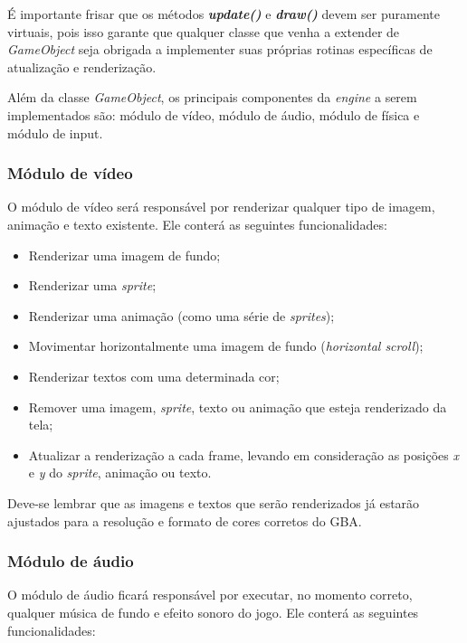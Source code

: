     É importante frisar que os métodos \textbf{\textit{update()}} e \textbf{\textit{draw()}} devem ser puramente virtuais, pois isso garante que qualquer classe que venha a extender de \textit{GameObject} seja obrigada a implementer suas próprias rotinas específicas de atualização e renderização.

    Além da classe \textit{GameObject}, os principais componentes da \textit{engine} a serem implementados são: módulo de vídeo, módulo de áudio, módulo de física e módulo de input.

    \subsubsection{Módulo de vídeo}

      O módulo de vídeo será responsável por renderizar qualquer tipo de imagem, animação e texto existente. Ele conterá as seguintes funcionalidades:

      \begin{itemize}
        \item Renderizar uma imagem de fundo;
        \item Renderizar uma \textit{sprite};
        \item Renderizar uma animação (como uma série de \textit{sprites});
        \item Movimentar horizontalmente uma imagem de fundo (\textit{horizontal scroll});
        \item Renderizar textos com uma determinada cor;
        \item Remover uma imagem, \textit{sprite}, texto ou animação que esteja renderizado da tela;
        \item Atualizar a renderização a cada frame, levando em consideração as posições \textit{x} e \textit{y} do \textit{sprite}, animação ou texto.
      \end{itemize}

      Deve-se lembrar que as imagens e textos que serão renderizados já estarão ajustados para a resolução e formato de cores corretos do GBA.

    \subsubsection{Módulo de áudio}

      O módulo de áudio ficará responsável por executar, no momento correto, qualquer música de fundo e efeito sonoro do jogo. Ele conterá as seguintes funcionalidades:

